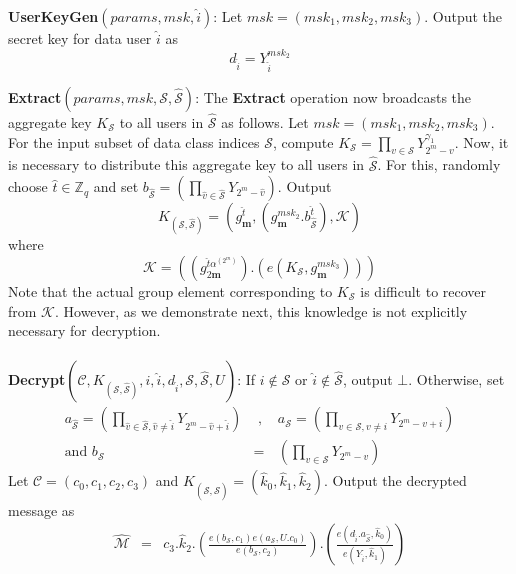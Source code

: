 \noindent\textbf{UserKeyGen}$(params,msk,\hat{i})$: Let $msk=(msk_1,msk_2,msk_3)$. Output the secret key for data user $\hat{i}$ as \begin{equation}
 d_{\hat{i}}=Y^{msk_2}_{\hat{i}}\nonumber
\end{equation}

\noindent\textbf{Extract}$(params,msk,\mathcal{S},\hat{\mathcal{S}})$: The \textbf{Extract} operation now broadcasts the aggregate key $K_{\mathcal{S}}$ to all users in $\hat{\mathcal{S}}$ as follows. Let $msk=(msk_1,msk_2,msk_3)$. For the input subset of data class indices $\mathcal{S}$, compute $K_{\mathcal{S}} = \prod_{v\in\mathcal{S}}Y^{\gamma_1}_{2^m-v}$. Now, it is necessary to distribute this aggregate key to all users in $\hat{\mathcal{S}}$. For this, randomly choose $\hat{t}\in\mathbb{Z}_q$ and set $b_{\hat{\mathcal{S}}}=\left(\prod_{\hat{v}\in\hat{\mathcal{S}}}Y_{2^m-\hat{v}}\right)$. Output 
\begin{equation}
K_{\left(\mathcal{S},\hat{\mathcal{S}}\right)}=\left(g^{\hat{t}}_{\mathbf{m}},\left(g^{msk_2}_{\mathbf{m}}.b^{\hat{t}}_{\hat{\mathcal{S}}}\right),\mathcal{K}\right)\nonumber
\end{equation}
\noindent where 
\begin{equation}
\mathcal{K} = \left(\left(g^{\hat{t}\alpha^{(2^m)}}_{2\mathbf{m}}\right).\left(e(K_{\mathcal{S}},g^{msk_3}_{\mathbf{m}})\right)\right)\nonumber
\end{equation}
\noindent Note that the actual group element corresponding to $K_{\mathcal{S}}$ is difficult to recover from $\mathcal{K}$. However, as we demonstrate next, this knowledge is not explicitly necessary for decryption.\\\\
%  
\noindent\textbf{Decrypt}$(\mathcal{C},K_{\left(\mathcal{S},\hat{\mathcal{S}}\right)},i,\hat{i},d_{\hat{i}},\mathcal{S},\hat{\mathcal{S}},U)$: If $i\notin\mathcal{S}$ or $\hat{i}\notin\hat{\mathcal{S}}$, output $\bot$. Otherwise, set
\begin{eqnarray}
 a_{\hat{\mathcal{S}}}=\left(\prod_{\hat{v}\in\hat{\mathcal{S}},\hat{v}\neq \hat{i}}Y_{2^m-\hat{v}+\hat{i}}\right)&\text{ , }&
 a_{\mathcal{S}}=\left(\prod_{v\in\mathcal{S},v\neq i}Y_{2^m-v+i}\right)\nonumber\\ 
 \text{and }b_{\mathcal{S}}&=&\left(\prod_{v\in\mathcal{S}}Y_{2^m-v}\right)\nonumber
\end{eqnarray}
\noindent Let $\mathcal{C}=(c_0,c_1,c_2,c_3)$ and $K_{\left(\mathcal{S},\hat{\mathcal{S}}\right)}=(\hat{k}_0,\hat{k}_1,\hat{k}_2)$. Output the decrypted message as  
\begin{eqnarray} 
\hat{\mathcal{M}}&=&c_3.\hat{k}_2.\left(\frac{e(b_{\mathcal{S}},c_1){e}(a_{\mathcal{S}},U.c_0)}{{e}(b_{\mathcal{S}},c_2)}\right).\left(\frac{e(d_{\hat{i}}.a_{\hat{\mathcal{S}}},\hat{k}_0)}{e(Y_{\hat{i}},\hat{k}_1)}\right) \nonumber
\end{eqnarray}

